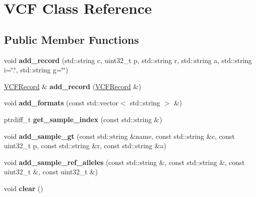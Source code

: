 \hypertarget{classVCF}{}\section{V\+CF Class Reference}
\label{classVCF}
\subsection*{Public Member Functions}
\begin{DoxyCompactItemize}
\item 
\mbox{\label{classVCF_a84fc6c1a477d10f747d0facb0096d194}} 
void {\bfseries add\+\_\+record} (std\+::string c, uint32\+\_\+t p, std\+::string r, std\+::string a, std\+::string i=\char`\"{}.\char`\"{}, std\+::string g=\char`\"{}\char`\"{})
\item 
\mbox{\label{classVCF_a57edaedcef6bfffb4ee1ae9f82b2f282}} 
\hyperlink{structVCFRecord}{V\+C\+F\+Record} \& {\bfseries add\+\_\+record} (\hyperlink{structVCFRecord}{V\+C\+F\+Record} \&)
\item 
\mbox{\label{classVCF_a150ea8b5fd1312540d2845746ed21159}} 
void {\bfseries add\+\_\+formats} (const std\+::vector$<$ std\+::string $>$ \&)
\item 
\mbox{\label{classVCF_a0890d71a1603151c9092db244864bf5f}} 
ptrdiff\+\_\+t {\bfseries get\+\_\+sample\+\_\+index} (const std\+::string \&)
\item 
\mbox{\label{classVCF_aaabe5597d48f4cca5da9f259d252eb5a}} 
void {\bfseries add\+\_\+sample\+\_\+gt} (const std\+::string \&name, const std\+::string \&c, const uint32\+\_\+t p, const std\+::string \&r, const std\+::string \&a)
\item 
\mbox{\label{classVCF_ab17bda29f53e402d65e07e7f30cbc7d6}} 
void {\bfseries add\+\_\+sample\+\_\+ref\+\_\+alleles} (const std\+::string \&, const std\+::string \&, const uint32\+\_\+t \&, const uint32\+\_\+t \&)
\item 
\mbox{\label{classVCF_acc69ff06098d92e28bfc7433aca9370d}} 
void {\bfseries clear} ()
\item 
\mbox{\label{classVCF_a508cf00e71166cad0e00350082f32982}} 

\end{DoxyCompactItemize}
